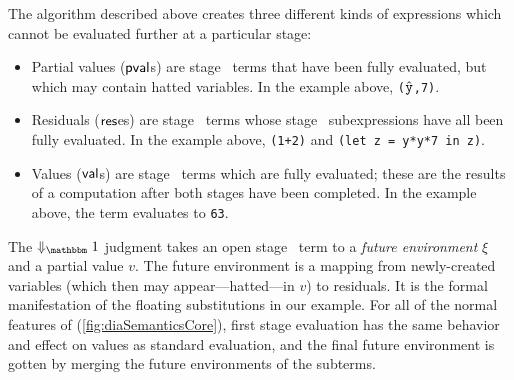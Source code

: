 

The algorithm described above creates three different kinds of expressions which
cannot be evaluated further at a particular stage:
\begin{itemize}
\item 
Partial values ($\mathsf{pval}$s) are stage \bbone\ terms that have been fully evaluated, 
but which may contain hatted variables. In the example above, 
\verb|(|$\hat {\tt y}$\verb|,7)|.
\item Residuals ($\mathsf{res}$es) are stage \bbtwo\ terms whose stage \bbone\
subexpressions have all been fully evaluated. In the example above,
\verb|(1+2)| and \verb|(let z = y*y*7 in z)|.
\item Values ($\mathsf{val}$s) are stage \bbtwo\ terms which are fully evaluated; these
are the results of a computation after both stages have been completed. In the
example above, the term evaluates to \verb|63|.
\end{itemize}
The $\redonesym$ judgment takes an open stage \bbone\ term to a {\em future environment} $\xi$ and a partial value $v$.
The future environment is a mapping from newly-created variables 
(which then may appear---hatted---in $v$)
to residuals.  It is the formal manifestation of the floating substitutions in our example.
For all of the normal features of \lang (\ref{fig:diaSemanticsCore}), first stage evaluation has the same behavior and effect on values as standard evaluation,
and the final future environment is gotten by merging the future environments of the subterms.

